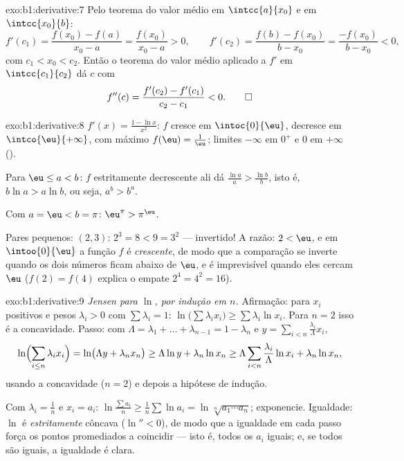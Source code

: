 \begin{solution}{exo:b1:derivative:7}
Pelo teorema do valor médio em $\intcc{a}{x_0}$ e em
$\intcc{x_0}{b}$:
\[
f'(c_1) = \frac{f(x_0) - f(a)}{x_0 - a} = \frac{f(x_0)}{x_0 - a} > 0,
\qquad
f'(c_2) = \frac{f(b) - f(x_0)}{b - x_0} = \frac{-f(x_0)}{b - x_0} < 0,
\]
com $c_1 < x_0 < c_2$. Então o teorema do valor médio aplicado a $f'$
em $\intcc{c_1}{c_2}$ dá $c$ com
\[
f''(c) = \frac{f'(c_2) - f'(c_1)}{c_2 - c_1} < 0 . \qedhere
\]
\end{solution}

\begin{solution}{exo:b1:derivative:8}
$f'(x) = \frac{1 - \ln x}{x^2}$: $f$ cresce em $\intoc{0}{\eu}$,
decresce em $\intco{\eu}{+\infty}$, com máximo $f(\eu) =
\frac1\eu$; limites $-\infty$ em $0^+$ e $0$ em $+\infty$ ().

Para $\eu \leq a < b$: $f$ estritamente decrescente ali dá
$\frac{\ln a}{a} > \frac{\ln b}{b}$, isto é, $b \ln a > a \ln b$,
ou seja, $a^b > b^a$.

Com $a = \eu < b = \pi$: $\eu^\pi > \pi^\eu$.

Pares pequenos: $(2, 3)$: $2^3 = 8 < 9 = 3^2$ --- invertido! A razão:
$2 < \eu$, e em $\intoo{0}{\eu}$ a função $f$ é
\emph{crescente}, de modo que a comparação se inverte quando os dois
números ficam abaixo de $\eu$, e é imprevisível quando eles cercam $\eu$
($f(2) = f(4)$ explica o empate $2^4 = 4^2 = 16$).
\end{solution}

\begin{solution}{exo:b1:derivative:9}
\emph{Jensen para $\ln$, por indução em $n$.} Afirmação: para $x_i$
positivos e pesos $\lambda_i > 0$ com $\sum \lambda_i = 1$:
$\ln\bigl(\sum \lambda_i x_i\bigr) \geq \sum \lambda_i \ln x_i$. Para
$n = 2$ isso é a concavidade. Passo: com $\Lambda = \lambda_1 + \dots +
\lambda_{n-1} = 1 - \lambda_n$ e $y = \sum_{i<n}
\frac{\lambda_i}{\Lambda} x_i$,
\[
\ln\Bigl(\sum_{i \leq n} \lambda_i x_i\Bigr)
= \ln\bigl(\Lambda y + \lambda_n x_n\bigr)
\geq \Lambda \ln y + \lambda_n \ln x_n
\geq \Lambda \sum_{i<n} \frac{\lambda_i}{\Lambda}\ln x_i
+ \lambda_n \ln x_n,
\]
usando a concavidade ($n = 2$) e depois a hipótese de indução.

Com $\lambda_i = \frac 1n$ e $x_i = a_i$: $\ln\frac{\sum a_i}{n}
\geq \frac 1n \sum \ln a_i = \ln\sqrt[n]{a_1\cdots a_n}$;
exponencie. Igualdade: $\ln$ é \emph{estritamente} côncava ($\ln'' < 0$),
de modo que a igualdade em cada passo força os pontos promediados a
coincidir --- isto é, todos os $a_i$ iguais; e, se todos são iguais, a
igualdade é clara.
\end{solution}

